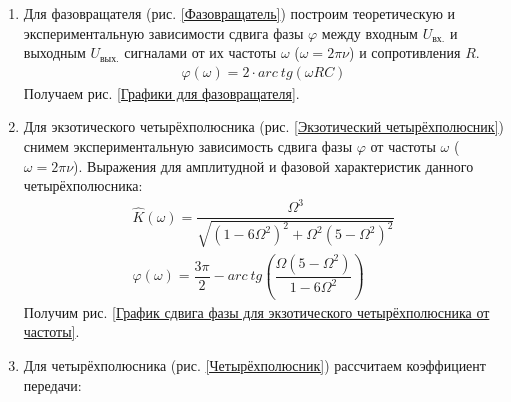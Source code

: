 \documentclass[a4paper, usenames, dvipsnames]{article}
\begin{document}
\begin{enumerate}
    \item Для фазовращателя (рис. \ref{Фазовращатель}) построим теоретическую и
          экспериментальную зависимости сдвига фазы $\varphi$ между входным
          $U_\text{вх.}$ и выходным $U_\text{вых.}$ сигналами
          от их частоты $\omega$ ($\omega = 2 \pi \nu$) и сопротивления $R$.
          \begin{gather*}
              \varphi(\omega) = 2 \cdot arc\ tg(\omega R C)
          \end{gather*}
          Получаем рис. \ref{Графики для фазовращателя}.
    \item Для экзотического четырёхполюсника (рис. \ref{Экзотический четырёхполюсник})
          снимем экспериментальную зависимость сдвига фазы $\varphi$
          от частоты $\omega$ ($\omega = 2 \pi \nu$).
          Выражения для амплитудной и фазовой характеристик данного четырёхполюсника:
          \begin{gather*}
              \hat{K}(\omega) = \dfrac{\Omega^3}{\sqrt{(1 - 6\Omega^2)^2 + \Omega^2(5 - \Omega^2)^2}} \\
              \varphi(\omega) = \dfrac{3\pi}{2} - arc\ tg\left(\dfrac{\Omega(5 - \Omega^2)}{1 - 6\Omega^2}\right)
          \end{gather*}
          Получим рис. \ref{График сдвига фазы для экзотического четырёхполюсника от частоты}.
    \item Для четырёхполюсника (рис. \ref{Четырёхполюсник}) рассчитаем коэффициент передачи:


\end{enumerate}
\end{document}

